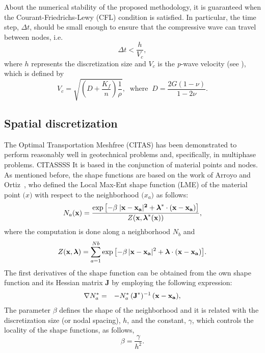 \documentclass[twocolumn]{svjour3}          %
\begin{document}
About the numerical stability of the proposed methodology, it is guaranteed when the Courant-Friedrichs-Lewy (CFL) condition is satisfied. In particular, the time step, $\Delta t$, should be small enough to ensure that the compressive wave can travel between nodes, i.e. 
  \begin{equation}
\Delta t < \frac{h}{V_c},
\end{equation}
where $h$ represents the discretization size and $V_c$ is the \textit{p}-wave velocity (see \cite{zienkiewicz1980}), which is defined by  
\begin{equation}
V_c=\sqrt{\left( D+\frac{K_f}{n}\right) \frac{1}{\rho}}, \; \; \textrm{where} \;\; D=\frac{2G(1-\nu)}{1-2\nu}.
\end{equation}\label{ex_2}

\subsection{Spatial discretization}
\label{subsec:41}
The Optimal Transportation Meshfree (CITAS) has been demonstrated to perform reasonably well in geotechnical problems and, specifically, in multiphase problems. CITASSSS It is based in the conjunction of material points and nodes. As mentioned before, the shape functions are based on the work of Arroyo and Ortiz~\cite{arroyo2006}, who defined the Local Max-Ent shape function (LME) of the material point $\boldsymbol(x)$ with respect to the neighborhood $\boldsymbol(x_a)$ as follows:
\begin{equation} \label{eq_N1}
N_a(\textbf{x})=\frac{\exp\left[ -\beta \; |\bf x-x_a|^2 +  \boldsymbol{\lambda}^*  \cdot  (x-x_a)  \right] } {Z(\textbf{x},\boldsymbol{\lambda}^*(\textbf{x}))},
\end{equation}
where the computation is done along a neighborhood $N_b$ and 
\begin{equation}\label{eq_N2}
Z({\bf x}, {\boldsymbol{\lambda}}) = \sum_{a=1}^{Nb}{ \exp \left[ -\beta \, |{\bf x-x_a}|^2 + \boldsymbol{\lambda}  \cdot  \bf {(x-x_a)}         \right]}.
\end{equation}
The first derivatives of the shape function can be obtained from the own shape function and its Hessian matrix \textbf{J} by employing the following expression:
\begin{eqnarray}
\nabla N^*_a &=& -N^*_a \,  (\textbf{J}^*)^{-1} \,  (\bf x-x_a) \label{eq_N3} ,
\end{eqnarray}
The parameter $\beta$ defines the shape of the neighborhood and it is related with the discretization size (or nodal spacing), $h$,  and the constant, $\gamma$, which controls the locality of the shape functions, as follows,
\begin{equation}\label{eqLM3}
\beta=\frac{\gamma}{h^2}.
\end{equation} 
\end{document}
